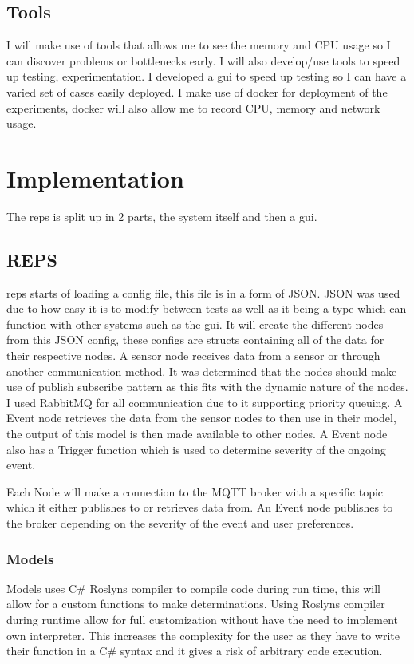 \documentclass[conference]{IEEEtran}
\begin{document}
		\subsection{Tools}
			I will make use of tools that allows me to see the memory and CPU usage so I can discover problems or bottlenecks early. I will also develop/use tools to speed up testing, experimentation. I developed a \gls{gui} to speed up testing so I can have a varied set of cases easily deployed. I make use of docker for deployment of the experiments, docker will also allow me to record CPU, memory and network usage.
			
	\section{Implementation}
		The \gls{reps} is split up in 2 parts, the system itself and then a \gls{gui}. 
		\subsection{REPS}\label{Reps:Imp}
			\gls{reps} starts of loading a config file, this file is in a form of JSON. JSON was used due to how easy it is to modify between tests as well as it being a type which can function with other systems such as the \gls{gui}. It will create the different nodes from this JSON config, these configs are structs containing all of the data for their respective nodes. A sensor node receives data from a sensor or through another communication method. It was determined that the nodes should make use of publish subscribe pattern as this fits with the dynamic nature of the nodes. I used RabbitMQ for all communication due to it supporting priority queuing. A Event node retrieves the data from the sensor nodes to then use in their model, the output of this model is then made available to other nodes. A Event node also has a Trigger function which is used to determine severity of the ongoing event.
			
			Each Node will make a connection to the MQTT broker with a specific topic which it either publishes to or retrieves data from. An Event node publishes to the broker depending on the severity of the event and user preferences.
			
			
			\subsubsection{Models}
				Models uses C\# Roslyns compiler to compile code during run time, this will allow for a custom functions to make determinations. Using Roslyns compiler during runtime allow for full customization without have the need to implement own interpreter. This increases the complexity for the user as they have to write their function in a C\# syntax and it gives a risk of arbitrary code execution.
				
\end{document}
